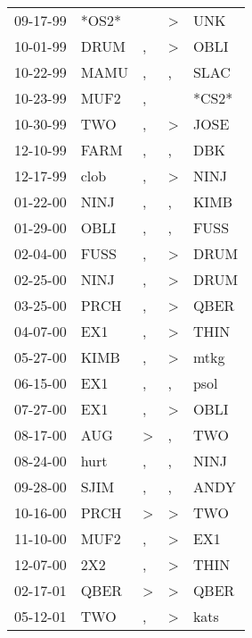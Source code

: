 \begin{supertabular}{lllll}
 09-17-99 &  *OS2* &                  &     \textgreater &    UNK \\
 10-01-99 &   DRUM &                , &     \textgreater &   OBLI \\
 10-22-99 &   MAMU &                , &                , &   SLAC \\
 10-23-99 &   MUF2 &                , &                  &  *CS2* \\
 10-30-99 &    TWO &                , &     \textgreater &   JOSE \\
 12-10-99 &   FARM &                , &                , &    DBK \\
 12-17-99 &   clob &                , &     \textgreater &   NINJ \\
 01-22-00 &   NINJ &                , &                , &   KIMB \\
 01-29-00 &   OBLI &                , &                , &   FUSS \\
 02-04-00 &   FUSS &                , &     \textgreater &   DRUM \\
 02-25-00 &   NINJ &                , &     \textgreater &   DRUM \\
 03-25-00 &   PRCH &                , &     \textgreater &   QBER \\
 04-07-00 &    EX1 &                , &     \textgreater &   THIN \\
 05-27-00 &   KIMB &                , &     \textgreater &   mtkg \\
 06-15-00 &    EX1 &                , &                , &   psol \\
 07-27-00 &    EX1 &                , &     \textgreater &   OBLI \\
 08-17-00 &    AUG &     \textgreater &                , &    TWO \\
 08-24-00 &   hurt &                , &                , &   NINJ \\
 09-28-00 &   SJIM &                , &                , &   ANDY \\
 10-16-00 &   PRCH &     \textgreater &     \textgreater &    TWO \\
 11-10-00 &   MUF2 &                , &     \textgreater &    EX1 \\
 12-07-00 &    2X2 &                , &     \textgreater &   THIN \\
 02-17-01 &   QBER &     \textgreater &     \textgreater &   QBER \\
 05-12-01 &    TWO &                , &     \textgreater &   kats \\

\end{supertabular}
